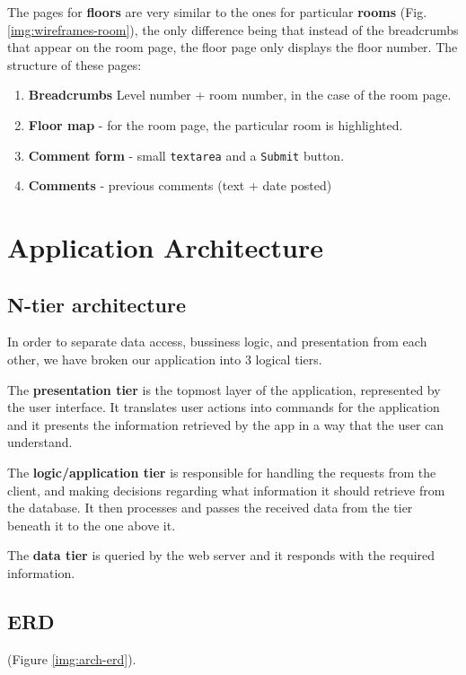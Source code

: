 \documentclass{sig-alt-release2}
\begin{document}
The pages for \textbf{floors} are very similar to the ones for particular
\textbf{rooms} (Fig. \ref{img:wireframes-room}), the only difference being that
instead of the breadcrumbs that appear on the room page, the floor page only 
displays the floor number. The structure of these pages:
\begin{enumerate} \itemsep1pt \parskip0pt 
	\item{\textbf{Breadcrumbs} Level number + room number, in the case of 
	the room page.}
	\item{\textbf{Floor map} - for the room page, the particular room is
	highlighted.}
	\item{\textbf{Comment form} - small \texttt{textarea} and a 
	\texttt{Submit} button.}
	\item{\textbf{Comments} - previous comments (text + date posted)}
\end{enumerate}


\section{Application Architecture}

\subsection*{N-tier architecture}
In order to separate data access, bussiness logic, and presentation from each
other, we have broken our application into 3 logical tiers.

The \textbf{presentation tier} is the topmost layer of the application,
represented by the user interface. It translates user actions into commands
for the application and it presents the information retrieved by the app in a
way that the user can understand.

The \textbf{logic/application tier} is responsible for handling the requests
from the client, and making decisions regarding what information it should
retrieve from the database. It then processes and passes the received data
from the tier beneath it to the one above it.

The \textbf{data tier} is queried by the web server and it responds with the
required information.

\subsection*{ERD}

 (Figure \ref{img:arch-erd}).
\end{document}
